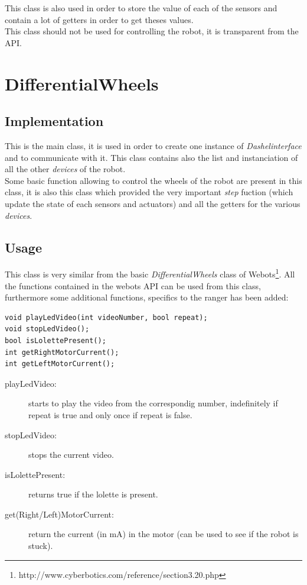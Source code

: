 \documentclass[a4paper,11pt]{report}
\begin{document}
This class is also used in order to store the value of each of the sensors and contain a lot of getters in order to get theses values.\\

This class should not be used for controlling the robot, it is transparent from the API.\\

\newpage
\section{DifferentialWheels}
\subsection{Implementation}
This is the main class, it is used in order to create one instance of \textit{Dashelinterface} and to communicate with it. This class contains also the list and instanciation of all the other \textit{devices} of the robot.\\

Some basic function allowing to control the wheels of the robot are present in this class, it is also this class which provided the very important \textit{step} fuction (which update the state of each sensors and actuators) and all the getters for the various \textit{devices}.\\

\subsection{Usage}
This class is very similar from the basic \textit{DifferentialWheels} class of Webots\footnote{http://www.cyberbotics.com/reference/section3.20.php}. All the functions contained in the webots API can be used from this class, furthermore some additional functions, specifics to the ranger has been added:

\lstset{language=c++} 
\lstset{commentstyle=\textit} 
\begin{lstlisting} 
void playLedVideo(int videoNumber, bool repeat);
void stopLedVideo();
bool isLolettePresent();
int getRightMotorCurrent();
int getLeftMotorCurrent();
\end{lstlisting}

\begin{description}
  \item[playLedVideo:] starts to play the video from the correspondig number, indefinitely if repeat is true and only once if repeat is false.
  \item[stopLedVideo:] stops the current video.
  \item[isLolettePresent:] returns true if the lolette is present.
  \item[get(Right/Left)MotorCurrent:] return the current (in mA) in the motor (can be used to see if the robot is stuck).
\end{description}
\end{document}
